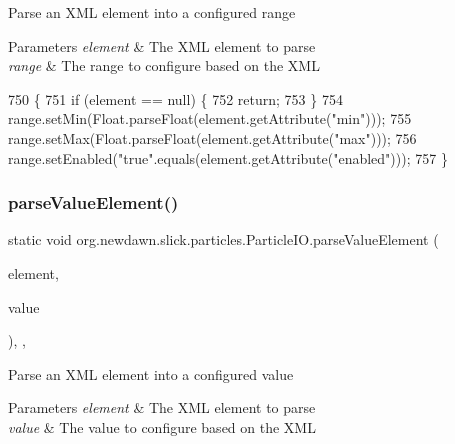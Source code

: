 Parse an X\+ML element into a configured range


\begin{DoxyParams}{Parameters}
{\em element} & The X\+ML element to parse \\
\hline
{\em range} & The range to configure based on the X\+ML \\
\hline
\end{DoxyParams}

\begin{DoxyCode}
750                                              \{
751         \textcolor{keywordflow}{if} (element == null) \{
752             \textcolor{keywordflow}{return};
753         \}
754         range.setMin(Float.parseFloat(element.getAttribute(\textcolor{stringliteral}{"min"})));
755         range.setMax(Float.parseFloat(element.getAttribute(\textcolor{stringliteral}{"max"})));
756         range.setEnabled(\textcolor{stringliteral}{"true"}.equals(element.getAttribute(\textcolor{stringliteral}{"enabled"})));
757     \}
\end{DoxyCode}
\mbox{\label{classorg_1_1newdawn_1_1slick_1_1particles_1_1_particle_i_o_a82b077f0d91ea3410e75e03e1d559a6b}} 
\subsubsection{\texorpdfstring{parse\+Value\+Element()}{parseValueElement()}}
{\footnotesize\ttfamily static void org.\+newdawn.\+slick.\+particles.\+Particle\+I\+O.\+parse\+Value\+Element (\begin{DoxyParamCaption}\item[{Element}]{element,  }\item[{Configurable\+Emitter.\+Value}]{value }\end{DoxyParamCaption})\hspace{0.3cm}{\ttfamily [inline]}, {\ttfamily [static]}, {\ttfamily [private]}}

Parse an X\+ML element into a configured value


\begin{DoxyParams}{Parameters}
{\em element} & The X\+ML element to parse \\
\hline
{\em value} & The value to configure based on the X\+ML \\
\hline
\end{DoxyParams}

